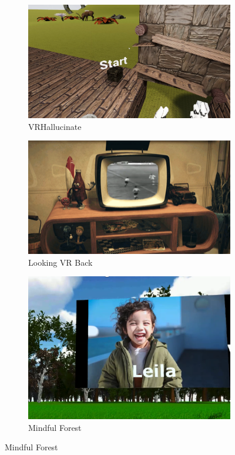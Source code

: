 \begin{figure}[htbp]
\begin{subfigure}[t]{0.3\textwidth}
    \includegraphics[width=\linewidth]{Images/DemVR/VRHallucinate.png}
\caption{VRHallucinate}
\label{fig:VRHallucinate}
\end{subfigure}\hfill
\begin{subfigure}[t]{0.3\textwidth}
    \includegraphics[width=\linewidth]{Images/DemVR/LookingVRBack.png}
\caption{Looking VR Back}
\label{fig:LookingVRBack}
\end{subfigure}\hfill
\begin{subfigure}[t]{0.3\textwidth}
    \includegraphics[width=\textwidth]{Images/DemVR/MindfulForest.png}
\caption{Mindful Forest}
\label{fig:MindfulForest}
\end{subfigure}


\end{figure}
